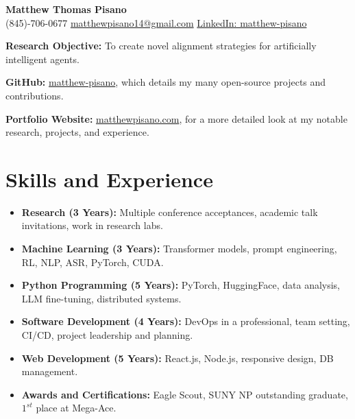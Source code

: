 \documentclass[11pt]{article}
\title{}
\author{\textbf{\LARGE Matthew Thomas Pisano}}
\date{}
\begin{document}
\pagestyle{plain}

\begin{tcolorbox}[width=\linewidth, sharp corners=all, colback=white!90!green, colframe=black]
    
    \begin{center}
        \textbf{\LARGE Matthew Thomas Pisano}\\
        \vspace{0.1in}
        (845)-706-0677 \hspace*{0.3in}
        \href{mailto:matthewpisano14@gmail.com}{matthewpisano14@gmail.com} \hspace*{0.5in}
        \href{https://www.linkedin.com/in/matthew-pisano/}{LinkedIn: matthew-pisano}
    \end{center}
    
\end{tcolorbox}

\vspace{0.1in}

\hspace*{-0.3in}
\textbf{Research Objective:} To create novel alignment strategies for artificially intelligent agents.

\vspace{0.1in}

\hspace*{-0.3in}
\textbf{GitHub:} \href{https://github.com/matthew-pisano}{matthew-pisano}, which details my many open-source projects and contributions.

\hspace*{-0.3in}
\textbf{Portfolio Website:} \href{https://matthewpisano.com}{matthewpisano.com}, for a more detailed look at my notable research, projects, and experience.

\section*{Skills and Experience}
\begin{itemize}
    \itemsep0em
    
    \item \textbf{Research (3 Years):} Multiple conference acceptances, academic talk invitations, work in research labs.
    \item \textbf{Machine Learning (3 Years):} Transformer models, prompt engineering, RL, NLP, ASR, PyTorch, CUDA.
    \item \textbf{Python Programming (5 Years):} PyTorch, HuggingFace, data analysis, LLM fine-tuning, distributed systems.
    \item \textbf{Software Development (4 Years):} DevOps in a professional, team setting, CI/CD, project leadership and planning.
    \item \textbf{Web Development (5 Years):} React.js, Node.js, responsive design, DB management.
    \item \textbf{Awards and Certifications:} Eagle Scout, SUNY NP outstanding graduate, $1^{st}$ place at Mega-Ace.

\end{itemize}
\end{document}
